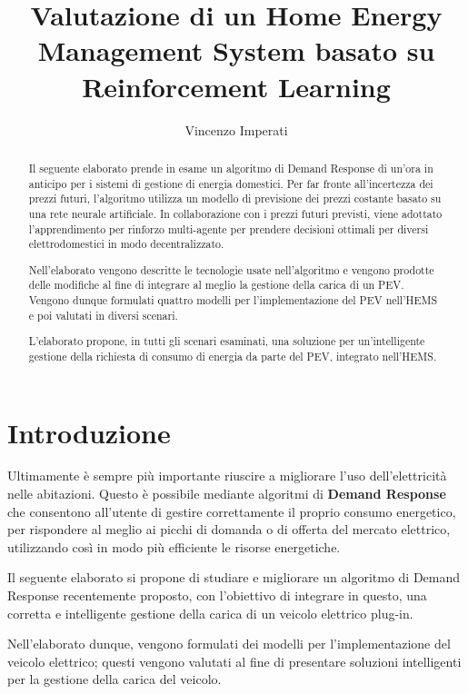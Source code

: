 \documentclass[italian, Lau, oneside]{sapthesis}
\title{Valutazione di un Home Energy Management System basato su Reinforcement Learning}
\author{Vincenzo Imperati}
\begin{document}
\frontmatter
\maketitle

\begin{abstract}
\indent
Il seguente elaborato prende in esame un algoritmo di Demand Response di un'ora in anticipo per i sistemi di gestione di energia domestici. Per far fronte all'incertezza dei prezzi futuri, l'algoritmo utilizza un modello di previsione dei prezzi costante basato su una rete neurale artificiale. In collaborazione con i prezzi futuri previsti, viene adottato l'apprendimento per rinforzo multi-agente per prendere decisioni ottimali per diversi elettrodomestici in modo decentralizzato.

Nell'elaborato vengono descritte le tecnologie usate nell'algoritmo e vengono prodotte delle modifiche al fine di integrare al meglio la gestione della carica di un PEV. Vengono dunque formulati quattro modelli per l'implementazione del PEV nell'HEMS e poi valutati in diversi scenari. 

L'elaborato propone, in tutti gli scenari esaminati, una soluzione per un'intelligente gestione della richiesta di consumo di energia da parte del PEV, integrato nell'HEMS.

\end{abstract}

\tableofcontents

\mainmatter
\chapter{Introduzione}
\label{chap:intro}
Ultimamente è sempre più importante riuscire a migliorare l'uso dell'elettricità nelle abitazioni. Questo è possibile mediante algoritmi di \textbf{Demand Response} che consentono all'utente di gestire correttamente il proprio consumo energetico, per rispondere al meglio ai picchi di domanda o di offerta del mercato elettrico, utilizzando così in modo più efficiente le risorse energetiche.

Il seguente elaborato si propone di studiare e migliorare un algoritmo di Demand Response recentemente proposto, con l'obiettivo di integrare in questo, una corretta e intelligente gestione della carica di un veicolo elettrico plug-in. 

Nell'elaborato dunque, vengono formulati dei modelli per l'implementazione del veicolo elettrico; questi vengono valutati al fine di presentare soluzioni intelligenti per la gestione della carica del veicolo.
\end{document}
